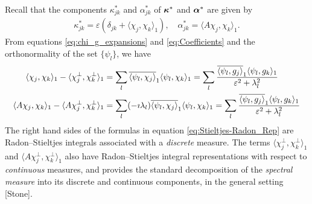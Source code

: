 \documentclass{article}
\newcommand\bkappa{\mbox{\boldmath${\kappa}$}}
\newcommand\balpha{\mbox{\boldmath${\alpha}$}}
\newcommand{\0}{\mathbf{0}}
\newcommand{\1}{\mathbf{1}}
\newcommand{\2}{\mathbf{2}}
\newcommand{\3}{\mathbf{3}}
\newcommand{\4}{\mathbf{4}}
\newcommand{\5}{\mathbf{5}}
\newcommand{\6}{\mathbf{6}}
\newcommand{\7}{\mathbf{7}}
\newcommand{\8}{\mathbf{8}}
\begin{document}
Recall that the components $\kappa^*_{jk}$ and $\alpha^*_{jk}$ of $\bkappa^*$
and $\balpha^*$ are given by 
%
\begin{align}
  \kappa^*_{jk}=\varepsilon(\delta_{jk}+\langle\chi_j,\chi_k\rangle_1), \quad
  \alpha^*_{jk}=\langle A\chi_j,\chi_k\rangle_1.
\end{align}
%
From equations \eqref{eq:chi_g_expansions} and \eqref{eq:Coefficients}
and the orthonormality of the set $\{\psi_l\}$, we have
%
\begin{align}\label{eq:Stieltjes-Radon_Rep}
  \langle\chi_j,\chi_k\rangle_1-\langle\chi_j^\perp,\chi_k^\perp\rangle_1&=\sum_l\overline{\langle\psi_l,\chi_j\rangle}_1\langle\psi_l,\chi_k\rangle_1
         =\sum_l\frac{\overline{\langle\psi_l,g_j\rangle}_1\langle\psi_l,g_k\rangle_1}{\varepsilon^2+\lambda_l^2}
         \notag\\
  \langle A\chi_j,\chi_k\rangle_1-\langle A\chi_j^\perp,\chi_k^\perp\rangle_1&=\sum_l(-\imath\lambda_l)\overline{\langle\psi_l,\chi_j\rangle}_1\langle\psi_l,\chi_k\rangle_1
         =\sum_l\frac{\overline{\langle\psi_l,g_j\rangle}_1\langle\psi_l,g_k\rangle_1}{\varepsilon^2+\lambda_l^2}      
\end{align}
%
The right hand sides of the formulas in equation
\eqref{eq:Stieltjes-Radon_Rep} are Radon--Stieltjes integrals
associated with a \emph{discrete} measure. The terms $\langle\chi_j^\perp,\chi_k^\perp\rangle_1$ and
$\langle A\chi_j^\perp,\chi_k^\perp\rangle_1$ also have Radon--Stieltjes integral representations
with respect to \emph{continuous} measures, and provides the standard
decomposition of the \emph{spectral measure} into its discrete and
continuous components, in the general setting [Stone].
\end{document}
